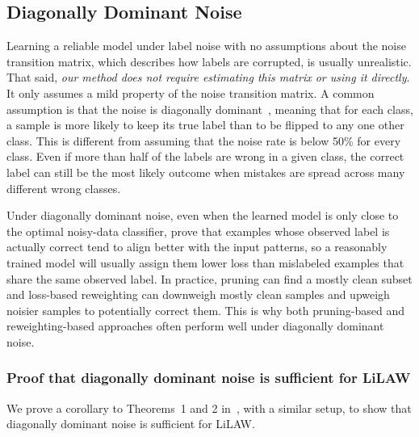\documentclass{article}
\theoremstyle{plain}
\theoremstyle{definition}
\theoremstyle{remark}
\begin{document}
\subsection{Diagonally Dominant Noise}
\label{proof:diag}

Learning a reliable model under label noise with no assumptions about the noise transition matrix, which describes how labels are corrupted, is usually unrealistic. That said, \textit{our method does not require estimating this matrix or using it directly}. It only assumes a mild property of the noise transition matrix. A common assumption is that the noise is diagonally dominant~\citep{han2018co, yu2019does}, meaning that for each class, a sample is more likely to keep its true label than to be flipped to any one other class. This is different from assuming that the noise rate is below 50\% for every class. Even if more than half of the labels are wrong in a given class, the correct label can still be the most likely outcome when mistakes are spread across many different wrong classes. 

Under diagonally dominant noise, even when the learned model is only close to the optimal noisy-data classifier, \citet{gui2021towards} prove that examples whose observed label is actually correct tend to align better with the input patterns, so a reasonably trained model will usually assign them lower loss than mislabeled examples that share the same observed label. In practice, pruning can find a mostly clean subset and loss-based reweighting can downweigh mostly clean samples and upweigh noisier samples to potentially correct them. This is why both pruning-based and reweighting-based approaches often perform well under diagonally dominant noise.

\subsubsection{Proof that diagonally dominant noise is sufficient for LiLAW}

\newcommand{\sigmoid}{\sigma}
\newcommand{\CE}{\ell_{\mathrm{CE}}}

We prove a corollary to Theorems~1 and 2 in~\citet{gui2021towards}, with a similar setup, to show that diagonally dominant noise is sufficient for LiLAW.
\end{document}
